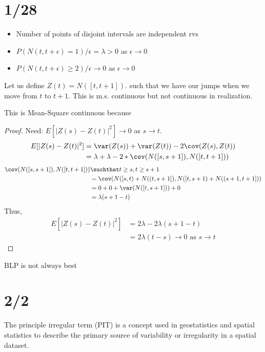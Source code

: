 \documentclass[answers,12pt,addpoints]{exam}
\begin{document}
\section{1/28}
\begin{remark}
    \begin{itemize}
        \item Number of points of disjoint intervals are independent rvs
        \item $P(N(t, t+\epsilon) = 1) / \epsilon = \lambda > 0$ as $\epsilon \to 0$
        \item $P(N(t, t+\epsilon) \geq 2) / \epsilon \to 0$ as $\epsilon \to 0$
    \end{itemize}

    Let us define $Z(t) = N([t,t+1])$. such that we have our jumps when we move from $t$ to $t+1$. This is m.s. continuous but not continuous in realization.

    This is Mean-Square continuous because
    \begin{proof}
        Need: $E[|Z(s) - Z(t)|^2] \to 0$ as $s \to t$.
        \begin{align*}
            E[|Z(s) - Z(t)|^2] &= \var(Z(s)) + \var(Z(t)) - 2\cov(Z(s), Z(t)) \\
            &= \lambda + \lambda - 2 * \cov(N([s,s+1]), N([t,t+1])) \\
        \end{align*}
        \begin{align*}
            \cov(N([s,s+1]), N([t,t+1])) &\suchthat t \geq s , t \geq s + 1 \\
            &= \cov(N([s,t) + N((t,s+1]), N([t,s+1) + N((s+1,t+1])) \\
            &= 0 + 0 + \var(N([t,s+1])) + 0 \\
            &= \lambda (s + 1 - t)
        \end{align*}
        Thus,
        \begin{align*}
            E[|Z(s) - Z(t)|^2] &= 2\lambda - 2\lambda (s + 1 - t) \\
            &= 2\lambda (t - s) \to 0 \text{ as } s \to t
        \end{align*}
    \end{proof}
    BLP is not always best
\end{remark}

\section{2/2}
\begin{definition}
    The principle irregular term (PIT) is a concept used in geostatistics and spatial statistics to describe the primary source of variability or irregularity in a spatial dataset. 
    
\end{definition}
\end{document}
